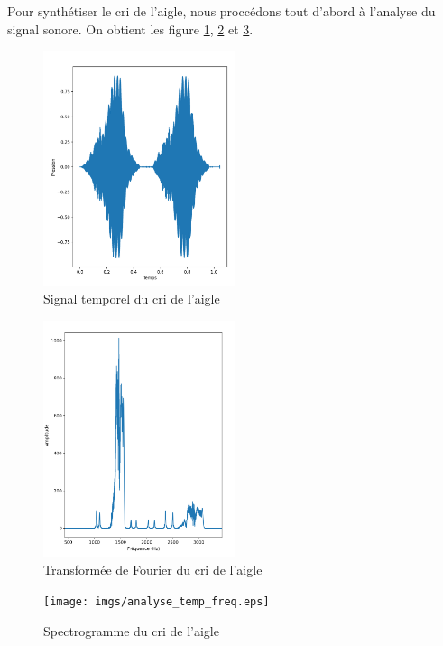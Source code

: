\documentclass[12pt]{report}
\begin{document}
Pour synthétiser le cri de l'aigle, nous proccédons tout d'abord à l'analyse du signal sonore. %
On obtient les figure \ref{fig:eaglesignaltemp}, \ref{fig:eaglespectrefreq} et \ref{fig:eaglespectrogramme}.

\begin{figure}[htbp]
    \centering
    \includegraphics[width=0.5\textwidth]{imgs/sig_sonor.png}
    \caption{Signal temporel du cri de l'aigle}
    \label{fig:eaglesignaltemp}
\end{figure}

\begin{figure}[htbp]
    \centering
    \includegraphics[width=0.5\textwidth]{imgs/fft.png}
    \caption{Transformée de Fourier du cri de l'aigle}
    \label{fig:eaglespectrefreq}
\end{figure}

\begin{figure}[htbp]
    \centering
    \texttt{[image: imgs/analyse\_temp\_freq.eps]}
    \caption{Spectrogramme du cri de l'aigle}
    \label{fig:eaglespectrogramme}
\end{figure}
\end{document}
